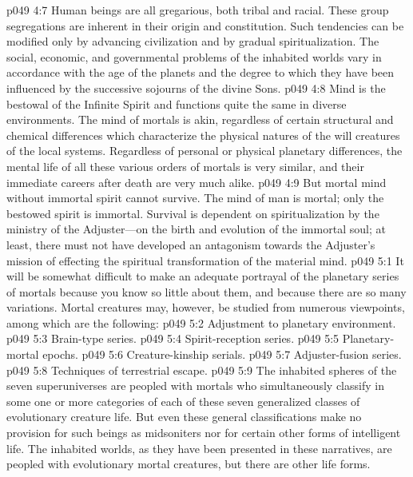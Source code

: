 \vs p049 4:7 Human beings are all gregarious, both tribal and racial. These group segregations are inherent in their origin and constitution. Such tendencies can be modified only by advancing civilization and by gradual spiritualization. The social, economic, and governmental problems of the inhabited worlds vary in accordance with the age of the planets and the degree to which they have been influenced by the successive sojourns of the divine Sons.
\pc \vs p049 4:8 Mind is the bestowal of the Infinite Spirit and functions quite the same in diverse environments. The mind of mortals is akin, regardless of certain structural and chemical differences which characterize the physical natures of the will creatures of the local systems. Regardless of personal or physical planetary differences, the mental life of all these various orders of mortals is very similar, and their immediate careers after death are very much alike.
\vs p049 4:9 But mortal mind without immortal spirit cannot survive. The mind of man is mortal; only the bestowed spirit is immortal. Survival is dependent on spiritualization by the ministry of the Adjuster---on the birth and evolution of the immortal soul; at least, there must not have developed an antagonism towards the Adjuster’s mission of effecting the spiritual transformation of the material mind.
\vs p049 5:1 It will be somewhat difficult to make an adequate portrayal of the planetary series of mortals because you know so little about them, and because there are so many variations. Mortal creatures may, however, be studied from numerous viewpoints, among which are the following:
\pc \vs p049 5:2 \bibnobreakspace Adjustment to planetary environment.
\vs p049 5:3 \bibnobreakspace Brain\hyp{}type series.
\vs p049 5:4 \bibnobreakspace Spirit\hyp{}reception series.
\vs p049 5:5 \bibnobreakspace Planetary\hyp{}mortal epochs.
\vs p049 5:6 \bibnobreakspace Creature\hyp{}kinship serials.
\vs p049 5:7 \bibnobreakspace Adjuster\hyp{}fusion series.
\vs p049 5:8 \bibnobreakspace Techniques of terrestrial escape.
\pc \vs p049 5:9 The inhabited spheres of the seven superuniverses are peopled with mortals who simultaneously classify in some one or more categories of each of these seven generalized classes of evolutionary creature life. But even these general classifications make no provision for such beings as midsoniters nor for certain other forms of intelligent life. The inhabited worlds, as they have been presented in these narratives, are peopled with evolutionary mortal creatures, but there are other life forms.
